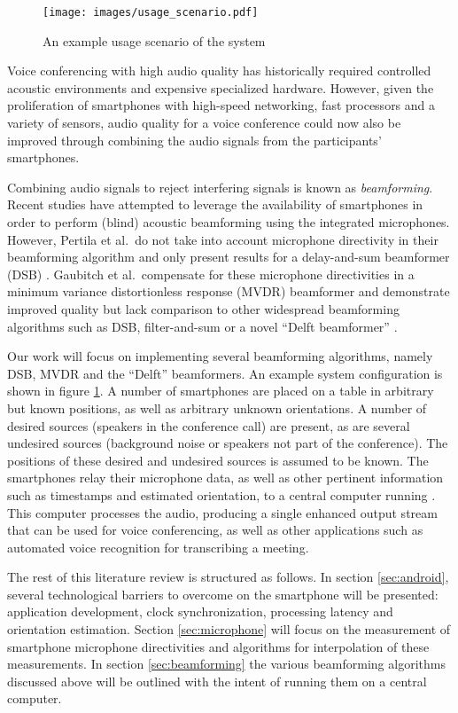 \begin{figure}[b!]
    \centering
    \texttt{[image: images/usage\_scenario.pdf]}
    \caption{An example usage scenario of the system}
    \label{fig:SchemUsage}
\end{figure}

Voice conferencing with high audio quality has historically required controlled acoustic environments and expensive specialized hardware. However, given the proliferation of smartphones with high-speed networking, fast processors and a variety of sensors, audio quality for a voice conference could now also be improved through combining the audio signals from the participants' smartphones.

Combining audio signals to reject interfering signals is known as \textit{beamforming}. Recent studies have attempted to leverage the availability of smartphones in order to perform (blind) acoustic beamforming \cite{Gaubitch2014, pertila2013} using the integrated microphones. However, Pertila et al.\ do not take into account microphone directivity in their beamforming algorithm and only present results for a delay-and-sum beamformer (DSB) \cite{pertila2013}. Gaubitch et al.\ compensate for these microphone directivities in a minimum variance distortionless response (MVDR) beamformer and demonstrate improved quality \cite{Gaubitch2014} but lack comparison to other widespread beamforming algorithms such as DSB, filter-and-sum \cite[p.~9]{naylor2010speech} or a novel ``Delft beamformer'' \cite{martinez2015}.

Our work will focus on implementing several beamforming algorithms, namely DSB, MVDR and the ``Delft'' beamformers. An example system configuration is shown in figure \ref{fig:SchemUsage}. A number of smartphones are placed on a table in arbitrary but known positions, as well as arbitrary unknown orientations. A number of desired sources (speakers in the conference call) are present, as are several undesired sources (background noise or speakers not part of the conference). The positions of these desired and undesired sources is assumed to be known. The smartphones relay their microphone data, as well as other pertinent information such as timestamps and estimated orientation, to a central computer running \matlab. This computer processes the audio, producing a single enhanced output stream that can be used for voice conferencing, as well as other applications such as automated voice recognition for transcribing a meeting.

The rest of this literature review is structured as follows. In section \ref{sec:android}, several technological barriers to overcome on the smartphone will be presented: application development, clock synchronization, processing latency and orientation estimation. Section \ref{sec:microphone} will focus on the measurement of smartphone microphone directivities and algorithms for interpolation of these measurements. In section \ref{sec:beamforming} the various beamforming algorithms discussed above will be outlined with the intent of running them on a central computer.